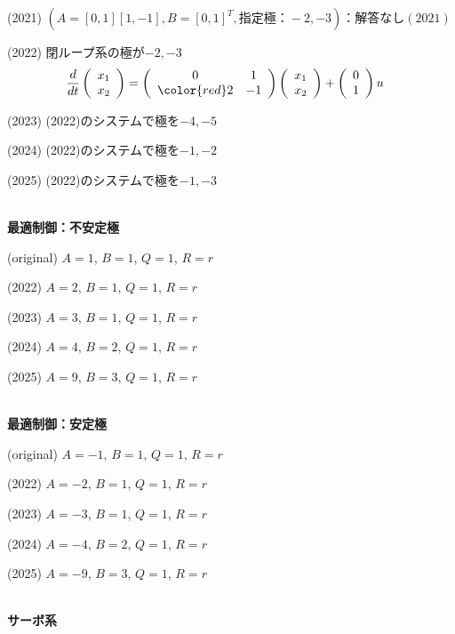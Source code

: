 (2021) $(A=[0, 1][1, -1], B=[0, 1]^T, 指定極：-2,-3)：解答なし(2021)$

(2022)
閉ループ系の極が{\color{red}$-2,-3$}
\begin{align*}
	\frac{d}{dt}
	\left (
	\begin{array}{c}
	 x_1 \\ x_2 
	\end{array}
	\right )
	& = 
	\left (
	\begin{array}{cc}
	 0 & 1 \\
	 \color{red} 2 & -1
	\end{array}
	\right )
	\left (
	\begin{array}{c}
	 x_1 \\ x_2 
	\end{array}
	\right )
	+
	\left (
	\begin{array}{c}
	 0 \\ 1 
	\end{array}
	\right )
	u
\end{align*}

(2023) (2022)のシステムで極を{\color{red}$-4,-5$}

(2024) (2022)のシステムで極を{\color{red}$-1,-2$}

(2025) (2022)のシステムで極を{\color{red}$-1,-3$}

\ \\ \noindent
{\bf 最適制御：不安定極}

(original)
$A=1$, $B=1$, $Q=1$, $R=r$

(2022)
{\color{red}$A=2$}, $B=1$, $Q=1$, $R=r$

(2023)
{\color{red}$A=3$}, $B=1$, $Q=1$, $R=r$

(2024)
{\color{red}$A=4$, $B=2$}, $Q=1$, $R=r$

(2025)
{\color{red}$A=9$, $B=3$}, $Q=1$, $R=r$

\ \\ \noindent
{\bf 最適制御：安定極}

(original)
$A=-1$, $B=1$, $Q=1$, $R=r$

(2022)
{\color{red}$A=-2$}, $B=1$, $Q=1$, $R=r$

(2023)
{\color{red}$A=-3$}, $B=1$, $Q=1$, $R=r$

(2024)
{\color{red}$A=-4$, $B=2$}, $Q=1$, $R=r$

(2025)
{\color{red}$A=-9$, $B=3$}, $Q=1$, $R=r$

\ \\ \noindent
{\bf サーボ系}

